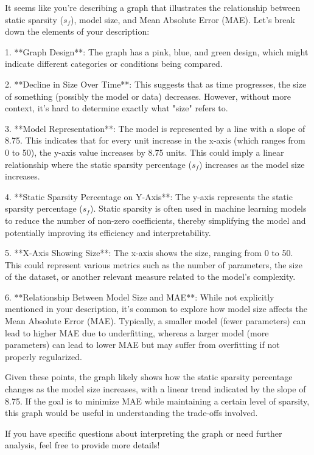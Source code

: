 It seems like you're describing a graph that illustrates the relationship between static sparsity (\( s_f \)), model size, and Mean Absolute Error (MAE). Let's break down the elements of your description:

1. **Graph Design**: The graph has a pink, blue, and green design, which might indicate different categories or conditions being compared.

2. **Decline in Size Over Time**: This suggests that as time progresses, the size of something (possibly the model or data) decreases. However, without more context, it's hard to determine exactly what "size" refers to.

3. **Model Representation**: The model is represented by a line with a slope of 8.75. This indicates that for every unit increase in the x-axis (which ranges from 0 to 50), the y-axis value increases by 8.75 units. This could imply a linear relationship where the static sparsity percentage (\( s_f \)) increases as the model size increases.

4. **Static Sparsity Percentage on Y-Axis**: The y-axis represents the static sparsity percentage (\( s_f \)). Static sparsity is often used in machine learning models to reduce the number of non-zero coefficients, thereby simplifying the model and potentially improving its efficiency and interpretability.

5. **X-Axis Showing Size**: The x-axis shows the size, ranging from 0 to 50. This could represent various metrics such as the number of parameters, the size of the dataset, or another relevant measure related to the model's complexity.

6. **Relationship Between Model Size and MAE**: While not explicitly mentioned in your description, it's common to explore how model size affects the Mean Absolute Error (MAE). Typically, a smaller model (fewer parameters) can lead to higher MAE due to underfitting, whereas a larger model (more parameters) can lead to lower MAE but may suffer from overfitting if not properly regularized.

Given these points, the graph likely shows how the static sparsity percentage changes as the model size increases, with a linear trend indicated by the slope of 8.75. If the goal is to minimize MAE while maintaining a certain level of sparsity, this graph would be useful in understanding the trade-offs involved.

If you have specific questions about interpreting the graph or need further analysis, feel free to provide more details!